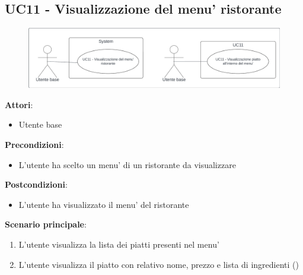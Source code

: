\subsection{UC11 - Visualizzazione del menu' ristorante} \label{usecase:11}
\begin{figure}[H]
    \centering
    \includegraphics[width=0.9\linewidth]{ucd/ucd11.png}
\end{figure}
\textbf{Attori}:
\begin{itemize}
    \item Utente base
\end{itemize}
\textbf{Precondizioni}:
\begin{itemize}
    \item L'utente ha scelto un menu' di un ristorante da visualizzare
\end{itemize}
\textbf{Postcondizioni}:
\begin{itemize}
    \item L'utente ha visualizzato il menu' del ristorante
\end{itemize}
\textbf{Scenario principale}:
\begin{enumerate}
    \item L'utente visualizza la lista dei piatti presenti nel menu'
    \item L’utente visualizza il piatto con relativo nome, prezzo e lista di ingredienti ()
\end{enumerate}

